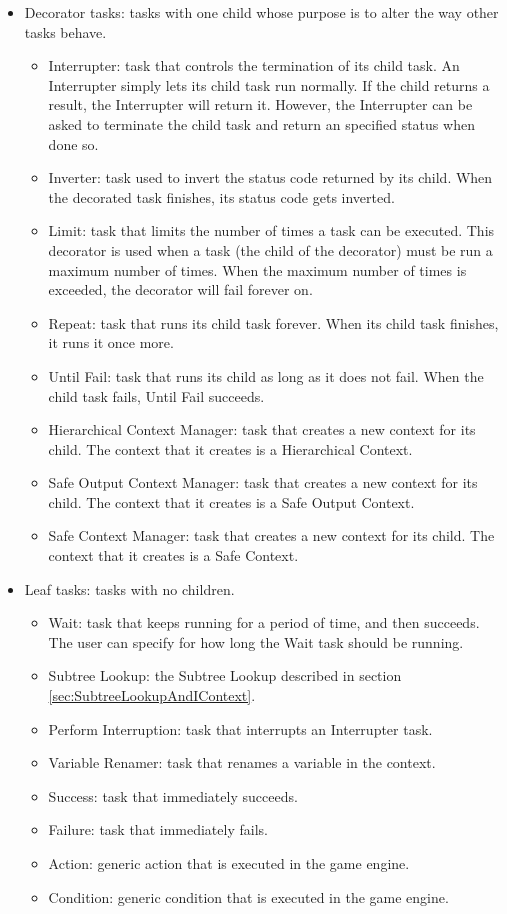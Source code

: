 \documentclass[a4paper,10pt]{article}
\begin{document}
\begin{itemize}
  \item Decorator tasks: tasks with one child whose purpose is to alter the way other tasks behave.
  \begin{itemize}
    \item Interrupter: task that controls the termination of its child task. An Interrupter simply lets its child task run normally. If the child returns a result, the Interrupter will return it. However, the Interrupter can be asked to terminate the child task and return an specified status when done so.
    \item Inverter: task used to invert the status code returned by its child. When the decorated task finishes, its status code gets inverted.
    \item Limit: task that limits the number of times a task can be executed. This decorator is used when a task (the child of the decorator) must be run a maximum number of times. When the maximum number of times is exceeded, the decorator will fail forever on.
    \item Repeat: task that runs its child task forever. When its child task finishes, it runs it once more.
    \item Until Fail: task that runs its child as long as it does not fail. When the child task fails, Until Fail succeeds.
    \item Hierarchical Context Manager: task that creates a new context for its child. The context that it creates is a Hierarchical Context.
    \item Safe Output Context Manager: task that creates a new context for its child. The context that it creates is a Safe Output Context.
    \item Safe Context Manager: task that creates a new context for its child. The context that it creates is a Safe Context.
  \end{itemize}
  \item Leaf tasks: tasks with no children.
  \begin{itemize}
    \item Wait: task that keeps running for a period of time, and then succeeds. The user can specify for how long the Wait task should be running.
    \item Subtree Lookup: the Subtree Lookup described in section \ref{sec:SubtreeLookupAndIContext}.
    \item Perform Interruption: task that interrupts an Interrupter task.
    \item Variable Renamer: task that renames a variable in the context.
    \item Success: task that immediately succeeds.
    \item Failure: task that immediately fails.
    \item Action: generic action that is executed in the game engine.
    \item Condition: generic condition that is executed in the game engine.
  \end{itemize}
\end{itemize}
\end{document}
